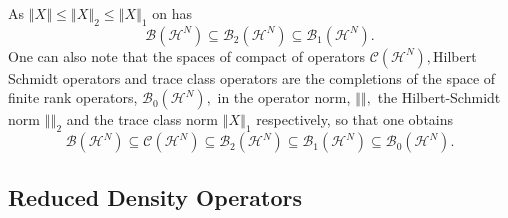 \documentclass[aps,preprint]{revtex4}%
\begin{document}
As $\left\Vert X\right\Vert \leq\left\Vert X\right\Vert _{2}\leq\left\Vert
X\right\Vert _{1}$ \cite{KummerI} on has
\begin{equation}
\mathcal{B}\left(  \mathcal{H}^{N}\right)  \subseteq\mathcal{B}_{2}\left(
\mathcal{H}^{N}\right)  \subseteq\mathcal{B}_{1}\left(  \mathcal{H}%
^{N}\right)  .
\end{equation}
One can also note that the spaces of compact of operators $\mathcal{C}\left(
\mathcal{H}^{N}\right)  ,$Hilbert Schmidt operators and trace class operators
are the completions of the space of finite rank operators, $\mathcal{B}%
_{0}\left(  \mathcal{H}^{N}\right)  ,$ in the operator norm, $\left\Vert
{}\right\Vert ,$ the Hilbert-Schmidt norm $\left\Vert {}\right\Vert _{2}$ and
the trace class norm $\left\Vert X\right\Vert _{1}$ respectively, so that one
obtains
\begin{equation}
\mathcal{B}\left(  \mathcal{H}^{N}\right)  \subseteq\mathcal{C}\left(
\mathcal{H}^{N}\right)  \subseteq\mathcal{B}_{2}\left(  \mathcal{H}%
^{N}\right)  \subseteq\mathcal{B}_{1}\left(  \mathcal{H}^{N}\right)
\subseteq\mathcal{B}_{0}\left(  \mathcal{H}^{N}\right)  .
\end{equation}


\subsection{Reduced Density Operators \label{RDO}}
\end{document}
